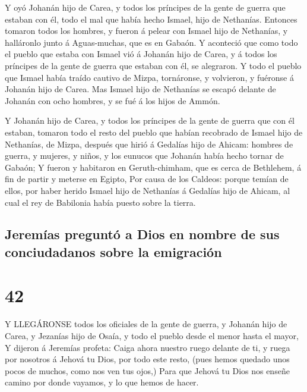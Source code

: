  Y oyó Johanán hijo de Carea, y todos los príncipes de la
gente de guerra que estaban con él, todo el mal que había hecho Ismael,
hijo de Nethanías.  Entonces tomaron todos los hombres, y
fueron á pelear con Ismael hijo de Nethanías, y halláronlo junto á
Aguas-muchas, que es en Gabaón.  Y aconteció que como todo
el pueblo que estaba con Ismael vió á Johanán hijo de Carea, y á todos
los príncipes de la gente de guerra que estaban con él, se alegraron.
 Y todo el pueblo que Ismael había traído cautivo de Mizpa,
tornáronse, y volvieron, y fuéronse á Johanán hijo de Carea.
 Mas Ismael hijo de Nethanías se escapó delante de Johanán
con ocho hombres, y se fué á los hijos de Ammón.

 Y Johanán hijo de Carea, y todos los príncipes de la gente
de guerra que con él estaban, tomaron todo el resto del pueblo que
habían recobrado de Ismael hijo de Nethanías, de Mizpa, después que
hirió á Gedalías hijo de Ahicam: hombres de guerra, y mujeres, y niños,
y los eunucos que Johanán había hecho tornar de Gabaón;  Y
fueron y habitaron en Geruth-chimham, que es cerca de Bethlehem, á fin
de partir y meterse en Egipto,  Por causa de los Caldeos:
porque temían de ellos, por haber herido Ismael hijo de Nethanías á
Gedalías hijo de Ahicam, al cual el rey de Babilonia había puesto sobre
la tierra.

\hypertarget{jeremuxedas-preguntuxf3-a-dios-en-nombre-de-sus-conciudadanos-sobre-la-emigraciuxf3n}{%
\subsection{Jeremías preguntó a Dios en nombre de sus conciudadanos
sobre la
emigración}\label{jeremuxedas-preguntuxf3-a-dios-en-nombre-de-sus-conciudadanos-sobre-la-emigraciuxf3n}}

\hypertarget{section-41}{%
\section{42}\label{section-41}}

 Y LLEGÁRONSE todos los oficiales de la gente de guerra, y
Johanán hijo de Carea, y Jezanías hijo de Osaía, y todo el pueblo desde
el menor hasta el mayor,  Y dijeron á Jeremías profeta:
Caiga ahora nuestro ruego delante de ti, y ruega por nosotros á Jehová
tu Dios, por todo este resto, (pues hemos quedado unos pocos de muchos,
como nos ven tus ojos,)  Para que Jehová tu Dios nos enseñe
camino por donde vayamos, y lo que hemos de hacer.

